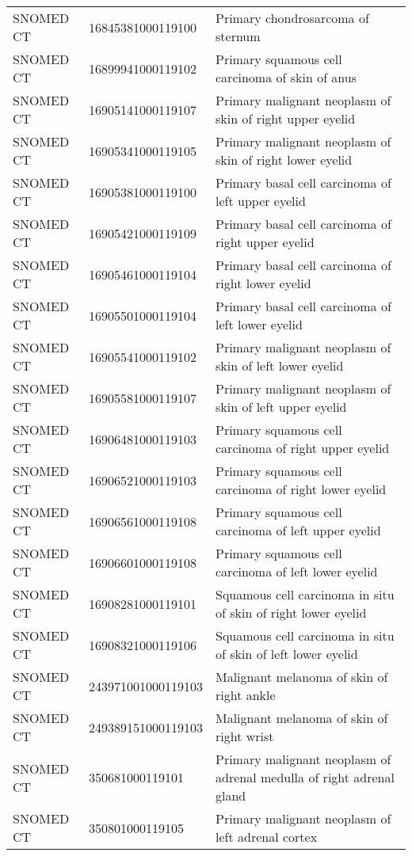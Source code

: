 \begin{longtable}{p{}p{}p{}}
  SNOMED CT & 16845381000119100 & Primary chondrosarcoma of sternum \\ 
  SNOMED CT & 16899941000119102 & Primary squamous cell carcinoma of skin of anus \\ 
  SNOMED CT & 16905141000119107 & Primary malignant neoplasm of skin of right upper eyelid \\ 
  SNOMED CT & 16905341000119105 & Primary malignant neoplasm of skin of right lower eyelid \\ 
  SNOMED CT & 16905381000119100 & Primary basal cell carcinoma of left upper eyelid \\ 
  SNOMED CT & 16905421000119109 & Primary basal cell carcinoma of right upper eyelid \\ 
  SNOMED CT & 16905461000119104 & Primary basal cell carcinoma of right lower eyelid \\ 
  SNOMED CT & 16905501000119104 & Primary basal cell carcinoma of left lower eyelid \\ 
  SNOMED CT & 16905541000119102 & Primary malignant neoplasm of skin of left lower eyelid \\ 
  SNOMED CT & 16905581000119107 & Primary malignant neoplasm of skin of left upper eyelid \\ 
  SNOMED CT & 16906481000119103 & Primary squamous cell carcinoma of right upper eyelid \\ 
  SNOMED CT & 16906521000119103 & Primary squamous cell carcinoma of right lower eyelid \\ 
  SNOMED CT & 16906561000119108 & Primary squamous cell carcinoma of left upper eyelid \\ 
  SNOMED CT & 16906601000119108 & Primary squamous cell carcinoma of left lower eyelid \\ 
  SNOMED CT & 16908281000119101 & Squamous cell carcinoma in situ of skin of right lower eyelid \\ 
  SNOMED CT & 16908321000119106 & Squamous cell carcinoma in situ of skin of left lower eyelid \\ 
  SNOMED CT & 243971001000119103 & Malignant melanoma of skin of right ankle \\ 
  SNOMED CT & 249389151000119103 & Malignant melanoma of skin of right wrist \\ 
  SNOMED CT & 350681000119101 & Primary malignant neoplasm of adrenal medulla of right adrenal gland \\ 
  SNOMED CT & 350801000119105 & Primary malignant neoplasm of left adrenal cortex \\ 

\end{longtable}
